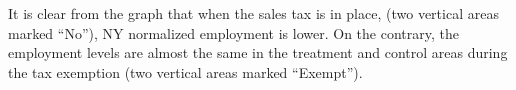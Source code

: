 \documentclass[12pt]{article}
\begin{document}
	It is clear from the graph that when the sales tax is in place, (two vertical areas marked ``No''), NY normalized employment is lower. On the contrary, the employment levels are almost the same in the treatment and control areas during the tax exemption (two vertical areas marked ``Exempt'').
	
	
	
	
	
\end{document}
